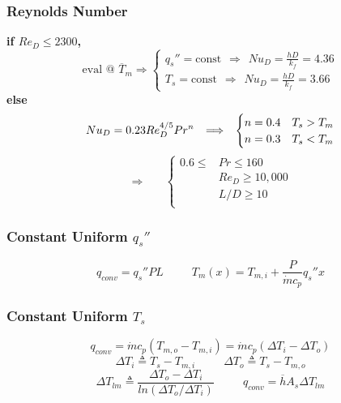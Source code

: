 \documentclass[twocolumn, 12pt]{article}
\begin{document}
\subsubsection*{Reynolds Number}
\textbf{if \(Re_D \leq 2300\),}
    \[
        \text{eval  @ } \overline{T}_m \Rightarrow
        \begin{cases}
            q_s'' = \text{const} \hspace{5pt} \Rightarrow \hspace{5pt} Nu_D =\frac{hD}{k_f} = 4.36\\
            T_s =\text{const} \hspace{5pt} \Rightarrow \hspace{5pt} Nu_D =\frac{hD}{k_f} = 3.66
        \end{cases}
    \]
    \noindent
        \textbf{else}
        \[
            Nu_D = 0.23Re_D^{4/5}Pr^n \hspace{7.5pt} \Longrightarrow \hspace{7.5pt} 
            \begin{cases}
                n = 0.4 &T_s>T_m\\
                n=0.3 &T_s<T_m
            \end{cases}
        \]
        \[
            \Longrightarrow \hspace{20pt}
            \begin{cases}
                0.6 \leq &Pr \leq 160\\
                        &Re_D \geq 10,000\\
                        &L/D\geq 10\\
            \end{cases}
        \]


\subsubsection*{Constant Uniform \(q_s''\)}
\begin{equation*}
    q_{conv} = q_s ''PL  \hspace{30pt} T_m(x) = T_{m,i} + \frac{P}{\Dot{m}c_p} q_s ''x
\end{equation*}





\subsubsection*{Constant Uniform \(T_s\)}
\begin{equation*}
    q_{conv} =\Dot{m}c_p(T_{m,o} - T_{m,i}) = \Dot{m}c_p (\Delta T_i - \Delta T_o)
\end{equation*}
\begin{equation*}
    \Delta T_i \triangleq T_s - T_{m,i} \hspace{30pt} \Delta T_o \triangleq T_s - T_{m,o}
\end{equation*}
\begin{equation*}
    \Delta T_{lm} \triangleq \frac{\Delta T_o -\Delta T_i} {ln(\Delta T_o/ \Delta T_i)} \hspace{30pt} q_{conv} = \overline{h}A_s \Delta T_{lm}
\end{equation*}
\end{document}
